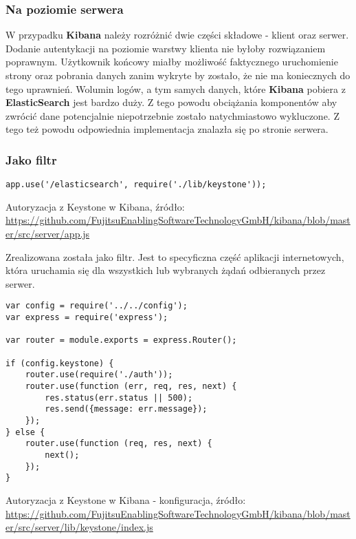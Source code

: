     \subsubsection{Na poziomie serwera}
    W przypadku \textbf{Kibana} należy rozróżnić dwie części składowe - klient oraz serwer. Dodanie autentykacji
    na poziomie warstwy klienta nie byłoby rozwiązaniem poprawnym. Użytkownik końcowy miałby możliwość faktycznego
    uruchomienie strony oraz pobrania danych zanim wykryte by zostało, że nie ma koniecznych do tego uprawnień.
    Wolumin logów, a tym samych danych, które \textbf{Kibana} pobiera z \textbf{ElasticSearch} jest bardzo duży.
    Z tego powodu obciążania komponentów aby zwrócić dane potencjalnie niepotrzebnie zostało
    natychmiastowo wykluczone. Z tego też powodu odpowiednia implementacja znalazła się po stronie serwera.
    
    \subsubsection{Jako filtr}
    \begin{listing}
        \begin{verbatim}
app.use('/elasticsearch', require('./lib/keystone'));
        \end{verbatim}
        \label{chapter:application_own:own_work:kibana_and_keystone:filter_code}
        \caption[Autoryzacja z Keystone w Kibana]{Autoryzacja z Keystone w Kibana, źródło: \url{https://github.com/FujitsuEnablingSoftwareTechnologyGmbH/kibana/blob/master/src/server/app.js}}
    \end{listing}
    Zrealizowana została jako filtr. Jest to specyficzna część aplikacji internetowych, która
    uruchamia się dla wszystkich lub wybranych żądań odbieranych przez serwer.
    
    \begin{listing}
        \begin{verbatim}
var config = require('../../config');
var express = require('express');

var router = module.exports = express.Router();

if (config.keystone) {
    router.use(require('./auth'));
    router.use(function (err, req, res, next) {
        res.status(err.status || 500);
        res.send({message: err.message});
    });
} else {
    router.use(function (req, res, next) {
        next();
    });
}
        \end{verbatim}
        \label{chapter:application_own:own_work:kibana_and_keystone:filter_configuration}
        \caption[Autoryzacja z Keystone w Kibana - konfiguracja]{Autoryzacja z Keystone w Kibana - konfiguracja, źródło: \url{https://github.com/FujitsuEnablingSoftwareTechnologyGmbH/kibana/blob/master/src/server/lib/keystone/index.js}}
    \end{listing}
    
